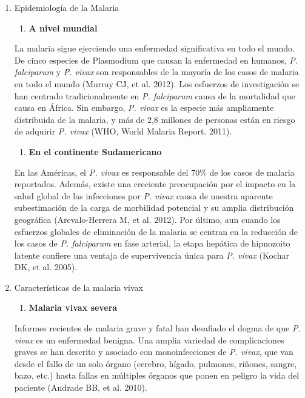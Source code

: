 \documentclass[]{article}
\providecommand{\tightlist}{%
  \setlength{\itemsep}{0pt}\setlength{\parskip}{0pt}}
\begin{document}
\begin{enumerate}
\def\labelenumi{\alph{enumi}.}
\item
  Epidemiología de la Malaria

  \begin{enumerate}
  \def\labelenumii{\roman{enumii}.}
  \tightlist
  \item
    \textbf{A nivel mundial}
  \end{enumerate}

  La malaria sigue ejerciendo una enfermedad significativa en todo el
  mundo. De cinco especies de Plasmodium que causan la enfermedad en
  humanos, \emph{P. falciparum} y \emph{P. vivax} son responsables de la
  mayoría de los casos de malaria en todo el mundo (Murray CJ, et al.
  2012). Los esfuerzos de investigación se han centrado tradicionalmente
  en \emph{P. falciparum} causa de la mortalidad que causa en África.
  Sin embargo, \emph{P. vivax} es la especie más ampliamente distribuida
  de la malaria, y más de 2,8 millones de personas están en riesgo de
  adquirir \emph{P. vivax} (WHO, World Malaria Report. 2011).

  \begin{enumerate}
  \def\labelenumii{\roman{enumii}.}
  \setcounter{enumii}{1}
  \tightlist
  \item
    \textbf{En el continente Sudamericano}
  \end{enumerate}

  En las Américas, el \emph{P. vivax} es responsable del 70\% de los
  casos de malaria reportados. Además, existe una creciente preocupación
  por el impacto en la salud global de las infecciones por \emph{P.
  vivax} causa de nuestra aparente subestimación de la carga de
  morbilidad potencial y su amplia distribución geográfica
  (Arevalo-Herrera M, et al. 2012). Por último, aun cuando los esfuerzos
  globales de eliminación de la malaria se centran en la reducción de
  los casos de \emph{P. falciparum} en fase arterial, la etapa hepática
  de hipnozoito latente confiere una ventaja de supervivencia única para
  \emph{P. vivax} (Kochar DK, et al. 2005).
\item
  Características de la malaria vivax

  \begin{enumerate}
  \def\labelenumii{\roman{enumii}.}
  \tightlist
  \item
    \textbf{Malaria vivax severa}
  \end{enumerate}

  Informes recientes de malaria grave y fatal han desafiado el dogma de
  que \emph{P. vivax} es un enfermedad benigna. Una amplia variedad de
  complicaciones graves se han descrito y asociado con monoinfecciones
  de \emph{P. vivax}, que van desde el fallo de un solo órgano (cerebro,
  hígado, pulmones, riñones, sangre, bazo, etc.) hasta fallas en
  múltiples órganos que ponen en peligro la vida del paciente (Andrade
  BB, et al. 2010).


\end{enumerate}
\end{document}
